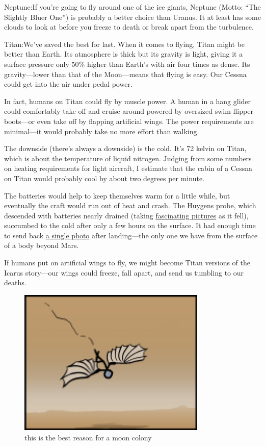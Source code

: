 {Neptune:If you’re going to fly around one of the ice giants, Neptune (Motto: “The Slightly Bluer One”) is probably a better choice than Uranus. It at least has some clouds to look at before you freeze to death or break apart from the turbulence.}

{Titan:We’ve saved the best for last. When it comes to flying, Titan might be better than Earth. Its atmosphere is thick but its gravity is light, giving it a surface pressure only 50\% higher than Earth’s with air four times as dense. Its gravity—lower than that of the Moon—means that flying is easy. Our Cessna could get into the air under pedal power.}

{In fact, humans on Titan could fly by muscle power. A human in a hang glider could comfortably take off and cruise around powered by oversized swim-flipper boots—or even take off by flapping artificial wings. The power requirements are minimal—it would probably take no more effort than walking.}

{The downside (there’s always a downside) is the cold. It’s 72 kelvin on Titan, which is about the temperature of liquid nitrogen. Judging from some numbers on heating requirements for light aircraft, I estimate that the cabin of a Cessna on Titan would probably cool by about two degrees per minute.}

{The batteries would help to keep themselves warm for a little while, but eventually the craft would run out of heat and crash. The Huygens probe, which descended with batteries nearly drained (taking \href{http://www.beugungsbild.de/huygens/huygens.html}{fascinating pictures} as it fell), succumbed to the cold after only a few hours on the surface. It had enough time to send back \href{http://www.esa.int/Our\_Activities/Space\_Science/Cassini-Huygens/New\_images\_from\_Titan}{a single photo} after landing—the only one we have from the surface of a body beyond Mars.}

{If humans put on artificial wings to fly, we might become Titan versions of the Icarus story—our wings could freeze, fall apart, and send us tumbling to our deaths.}

\begin{figure}[!htbp]
\centering
\includegraphics[scale=0.5, max width=0.8\textwidth]{imgs/a/30/cessna_icarus.png}
\caption{this is the best reason for a moon colony}
\end{figure}

